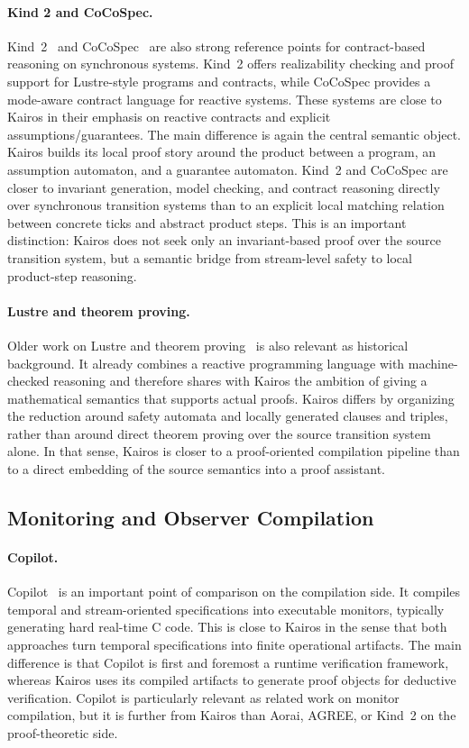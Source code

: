 \documentclass[11pt,a4paper]{article}
\begin{document}
\paragraph{Kind 2 and CoCoSpec.}
Kind~2~\cite{kind2-realizability} and CoCoSpec~\cite{cocospec} are also strong
reference points for contract-based reasoning on synchronous systems. Kind~2
offers realizability checking and proof support for Lustre-style programs and
contracts, while CoCoSpec provides a mode-aware contract language for reactive
systems. These systems are close to Kairos in their emphasis on reactive
contracts and explicit assumptions/guarantees. The main difference is again the
central semantic object. Kairos builds its local proof story around the product
between a program, an assumption automaton, and a guarantee automaton. Kind~2
and CoCoSpec are closer to invariant generation, model checking, and contract
reasoning directly over synchronous transition systems than to an explicit local
matching relation between concrete ticks and abstract product steps. This is an
important distinction: Kairos does not seek only an invariant-based proof over
the source transition system, but a semantic bridge from stream-level safety to
local product-step reasoning.

\paragraph{Lustre and theorem proving.}
Older work on Lustre and theorem proving~\cite{lustre-pvs} is also relevant as
historical background. It already combines a reactive programming language with
machine-checked reasoning and therefore shares with Kairos the ambition of
giving a mathematical semantics that supports actual proofs. Kairos differs by
organizing the reduction around safety automata and locally generated
clauses and triples, rather than around direct theorem proving over the source
transition system alone. In that sense, Kairos is closer to a proof-oriented
compilation pipeline than to a direct embedding of the source semantics into a
proof assistant.

\subsection{Monitoring and Observer Compilation}

\paragraph{Copilot.}
Copilot~\cite{copilot-github,copilot3} is an important point of comparison on
the compilation side. It compiles temporal and stream-oriented specifications
into executable monitors, typically generating hard real-time C code. This is
close to Kairos in the sense that both approaches turn temporal specifications
into finite operational artifacts. The main difference is that Copilot is first
and foremost a runtime verification framework, whereas Kairos uses its compiled
artifacts to generate proof objects for deductive verification.
Copilot is particularly relevant as related work on monitor compilation, but it
is further from Kairos than Aorai, AGREE, or Kind~2 on the proof-theoretic
side.
\end{document}
